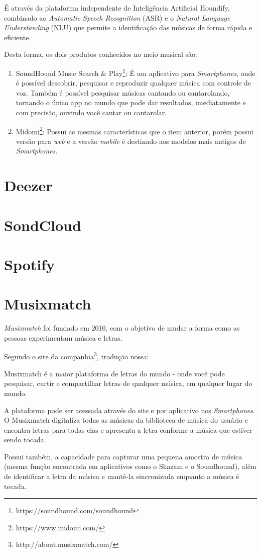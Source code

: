 É através da plataforma independente de Inteligência Artificial Houndify, combinado ao \textit{Automatic Speech Recognition} (ASR) e o \textit{Natural Language Understanding} (NLU) que permite a identificação das músicas de forma rápida e eficiente.

Desta forma, os dois produtos conhecidos no meio musical são:

\begin{enumerate}
    \item SoundHound Music Search & Play\footnote{https://soundhound.com/soundhound}: É um aplicativo para \textit{Smartphones}, onde é possível descobrir, pesquisar e reproduzir qualquer música com controle de voz. Também é possível pesquisar músicas cantando ou cantarolando, tornando o único app no mundo que pode dar resultados, imediatamente e com precisão, ouvindo você cantar ou cantarolar.
    \item Midomi\footnote{https://www.midomi.com/}: Possui as mesmas características que o item anterior, porém possui versão para \textit{web} e a versão \textit{mobile} é destinado aos modelos mais antigos de \textit{Smartphones}.
\end{enumerate}

\section{Deezer}

\section{SondCloud}

\section{Spotify}

\section{Musixmatch}
\textit{Musixmatch} foi fundado em 2010, com o objetivo de mudar a forma como as pessoas experimentam música e letras.

Segundo o site da companhia\footnote{http://about.musixmatch.com/}, tradução nossa:

\begin{citation}
Musixmatch é a maior plataforma de letras do mundo - onde você pode pesquisar, curtir e compartilhar letras de qualquer música, em qualquer lugar do mundo.
\end{citation}

A plataforma pode ser acessada através do site e por aplicativo nos \textit{Smartphones}. O Musixmatch digitaliza todas as músicas da biblioteca de música do usuário e encontra letras para todas elas e apresenta a letra conforme a música que estiver sendo tocada. 

Possui também, a capacidade para capturar uma pequena amostra de música (mesma função encontrada em aplicativos como o Shazam e o Soundhound), além de identificar a letra da música e mantê-la sincronizada enquanto a música é tocada.

